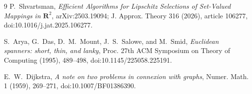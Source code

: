 \documentclass[11pt]{article}
\begin{document}
\begin{thebibliography}{9}
P.~Shvartsman,
\emph{Efficient Algorithms for Lipschitz Selections of Set-Valued Mappings in
$\mathbf R^2$},
arXiv:2503.19094; J. Approx. Theory 316 (2026), article 106277,
doi:10.1016/j.jat.2025.106277.

S.~Arya, G.~Das, D.~M.~Mount, J.~S.~Salowe, and M.~Smid,
\emph{Euclidean spanners: short, thin, and lanky},
Proc. 27th ACM Symposium on Theory of Computing (1995), 489--498,
doi:10.1145/225058.225191.

E.~W.~Dijkstra,
\emph{A note on two problems in connexion with graphs},
Numer. Math. 1 (1959), 269--271,
doi:10.1007/BF01386390.
\end{thebibliography}
\end{document}
